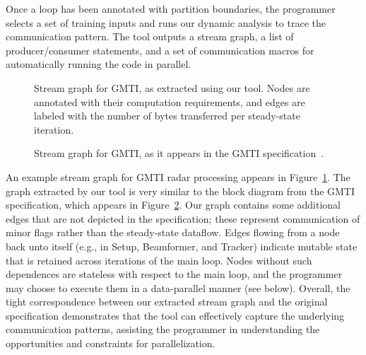 Once a loop has been annotated with partition boundaries, the
programmer selects a set of training inputs and runs our dynamic
analysis to trace the communication pattern.  The tool outputs a
stream graph, a list of producer/consumer statements, and a set of
communication macros for automatically running the code in parallel.

\begin{figure}[t!]
\centering
\hspace{0in}
\caption[Stream graph for GMTI, as extracted using our tool.]{Stream
  graph for GMTI, as extracted using our tool.  Nodes are annotated
  with their computation requirements, and edges are labeled with the
  number of bytes transferred per steady-state
  iteration.\protect\label{fig:gmti-graph-tool}}
\end{figure}

\begin{figure}[t!]
\vspace{6pt}
\centering
\hspace{0in}
\caption[Stream graph for GMTI, as it appears in the GMTI
  specification.]{Stream graph for GMTI, as it appears in the GMTI
  specification~\protect\cite{reuther03gmti}.\protect\label{fig:gmti-graph-spec}}
\vspace{-6pt}
\end{figure}

An example stream graph for GMTI radar processing appears in
Figure~\ref{fig:gmti-graph-tool}.  The graph extracted by our tool is
very similar to the block diagram from the GMTI specification, which
appears in Figure~\ref{fig:gmti-graph-spec}.  Our graph contains some
additional edges that are not depicted in the specification; these
represent communication of minor flags rather than the steady-state
dataflow.  Edges flowing from a node back unto itself (e.g., in Setup,
Beamformer, and Tracker) indicate mutable state that is retained
across iterations of the main loop.  Nodes without such dependences
are stateless with respect to the main loop, and the programmer may
choose to execute them in a data-parallel manner (see below).
Overall, the tight correspondence between our extracted stream graph
and the original specification demonstrates that the tool can
effectively capture the underlying communication patterns, assisting
the programmer in understanding the opportunities and constraints for
parallelization.

